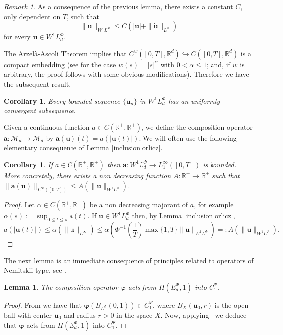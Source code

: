 \documentclass[twoside]{elsarticle}
\newtheorem{cor}[thm]{Corollary}
\newtheorem{lem}[thm]{Lemma}
\theoremstyle{remark}
\newtheorem{comentario}{Remark}
\newcommand{\orlnor}{\|_{L^{\Phi}}}
\newcommand{\lphi}{L^{\Phi}}
\newcommand{\ephi}{E^{\Phi}}
\newcommand{\wphi}{W^{1}\lphi}
\newcommand{\sobnor}{\|_{W^{1}\lphi}}
\renewcommand{\b}[1]{\boldsymbol{#1}}
\newcommand{\rr}{\mathbb{R}}
\renewcommand{\leq}{\leqslant}
\begin{document}
\begin{comentario}
As a consequence of the previous lemma,  
there exists a constant $C$, only dependent on $T$, such that 
\begin{equation}\label{cota_prome}\|\b{u}\sobnor\leq C\left(|\b{\overline{u}}|+\|\b{\dot{u}}\orlnor\right)\end{equation}
for every $\b{u}\in\wphi_d$.
\end{comentario}

The Arzel\`a-Ascoli Theorem implies that  $C^w([0,T],\rr^d)\hookrightarrow C([0,T],\rr^d)$ is a compact  embedding (see \cite[Ch. 5]{driver} for the case $w(s)=|s|^{\alpha}$ with $0< \alpha\leq 1$; and, if  $w$ is arbitrary, the proof follows with some obvious modifications). Therefore we have the subsequent result.

 \begin{cor}\label{unif_conv} Every bounded sequence $\{\b{u}_n\}$ in  $\wphi_d$  has an uniformly convergent subsequence. 
\end{cor}


 Given a continuous function $a\in C(\mathbb{R}^+,\mathbb{R}^+)$, we define the composition operator $\b{a}:\mathcal{M}_d\to \mathcal{M}_d$ by $\b{a}(\b{u})(t)= a(|\b{u}(t)|)$.
We will often use the following elementary consequence of Lemma \ref{inclusion orlicz}. 
\begin{cor}\label{a_bound} If $a\in C(\mathbb{R}^+,\mathbb{R}^+)$ then $\b{a}:\wphi_d\to L^{\infty}_1([0,T])$ is bounded. 
More concretely,  there exists a non decreasing function $A:\mathbb{R}^+\to\mathbb{R}^+$ such that
 $\|\b{a}(\b{u})\|_{L^{\infty}([0,T])}\leq A(\|\b{u}\|_{\wphi})$.
\end{cor}

\begin{proof}  Let $\alpha\in C(\mathbb{R}^+,\mathbb{R}^+)$ be a  non decreasing  majorant of $a$, for example 
$\alpha(s):=\sup_{0\leq t\leq s}a(t)$.  If $\b{u}\in \wphi_d$ then, by Lemma \ref{inclusion orlicz}, 
\[a(|\b{u}(t)|)\leq \alpha(\|\b{u}\|_{L^{\infty}})\leq 
\alpha\left(\Phi^{-1}\left(\frac{1}{T}\right)\max\{1,T\} \|\b{u}\|_{\wphi}\right)=: 
A(\|\b{u}\|_{\wphi}).\]
\end{proof}


The next lemma is an immediate consequence of principles  related to  operators of Nemitskii type, see \cite[]{KR}.

\begin{lem}\label{phi_comp}   
The  composition operator  $\boldsymbol{\varphi}$  acts from $\Pi(\ephi_d,1)$ into $C_1^{\Psi}$.
\end{lem}
\begin{proof}
From \cite[Lemma 9.1]{KR} we have that  $\boldsymbol{\varphi}\left(B_{\lphi}(0,1)\right)\subset C_1^{\Psi}$, where
$B_{X}(\b{u}_0,r)$ is the open ball with center $\b{u}_0$ and radius $r>0$ in the space $X$. Now, applying \cite[Lemma 17.1]{KR}, we deduce that $\boldsymbol{\varphi}$ acts from $\Pi(\ephi_d,1)$ into $C_1^{\Psi}$.
\end{proof}
\end{document}
